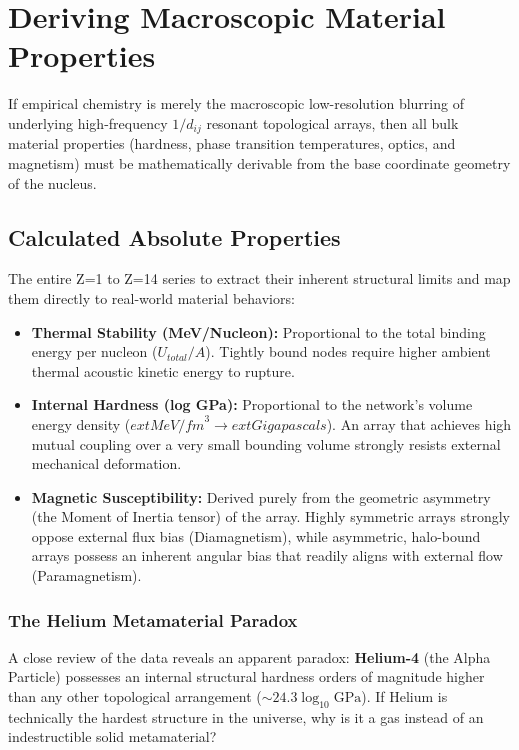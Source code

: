 \chapter{Deriving Macroscopic Material Properties}
\label{ch:derived_properties}

If empirical chemistry is merely the macroscopic low-resolution blurring of underlying high-frequency $1/d_{ij}$ resonant topological arrays, then all bulk material properties (hardness, phase transition temperatures, optics, and magnetism) must be mathematically derivable from the base coordinate geometry of the nucleus.

\section{Calculated Absolute Properties}
The entire Z=1 to Z=14 series to extract their inherent structural limits and map them directly to real-world material behaviors:
\begin{itemize}
    \item \textbf{Thermal Stability (MeV/Nucleon):} Proportional to the total binding energy per nucleon ($U_{total} / A$). Tightly bound nodes require higher ambient thermal acoustic kinetic energy to rupture.
    \item \textbf{Internal Hardness (log GPa):} Proportional to the network's volume energy density ($	ext{MeV/fm}^3 \to 	ext{Gigapascals}$). An array that achieves high mutual coupling over a very small bounding volume strongly resists external mechanical deformation.
    \item \textbf{Magnetic Susceptibility:} Derived purely from the geometric asymmetry (the Moment of Inertia tensor) of the array. Highly symmetric arrays strongly oppose external flux bias (Diamagnetism), while asymmetric, halo-bound arrays possess an inherent angular bias that readily aligns with external flow (Paramagnetism).
\end{itemize}

\subsection*{The Helium Metamaterial Paradox}
A close review of the data reveals an apparent paradox: \textbf{Helium-4} (the Alpha Particle) possesses an internal structural hardness orders of magnitude higher than any other topological arrangement ($\sim 24.3 \log_{10} \text{GPa}$). If Helium is technically the hardest structure in the universe, why is it a gas instead of an indestructible solid metamaterial?

